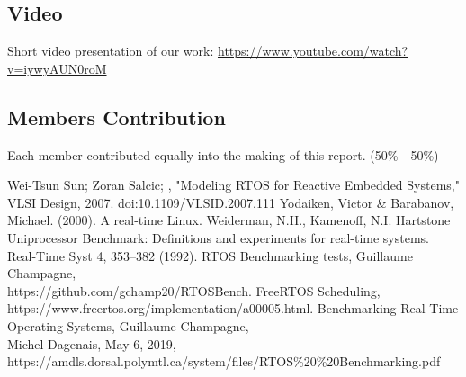\documentclass[conference]{IEEEtran}
\begin{document}
\subsection{Video}

Short video presentation of our work: \url{https://www.youtube.com/watch?v=iywyAUN0roM}

\subsection{Members Contribution}
Each member contributed equally into the making of this report. (50\% - 50\%)

\vspace{-1.30mm}
\begin{thebibliography}{00}

 Wei-Tsun Sun; Zoran Salcic; , "Modeling RTOS for Reactive Embedded Systems," VLSI Design, 2007. doi:10.1109/VLSID.2007.111
 Yodaiken, Victor \& Barabanov, Michael. (2000). A real-time Linux.
 Weiderman, N.H., Kamenoff, N.I. Hartstone Uniprocessor Benchmark: Definitions and experiments for real-time systems. Real-Time Syst 4, 353–382 (1992).
 RTOS Benchmarking tests, Guillaume Champagne, \\ 
https://github.com/gchamp20/RTOSBench.
 FreeRTOS Scheduling, \\ 
https://www.freertos.org/implementation/a00005.html.
 Benchmarking Real Time Operating Systems, Guillaume Champagne, \\
Michel Dagenais, May 6, 2019, \\ https://amdls.dorsal.polymtl.ca/system/files/RTOS\%20\%20Benchmarking.pdf

\end{thebibliography}
\vspace{12pt}
\end{document}
